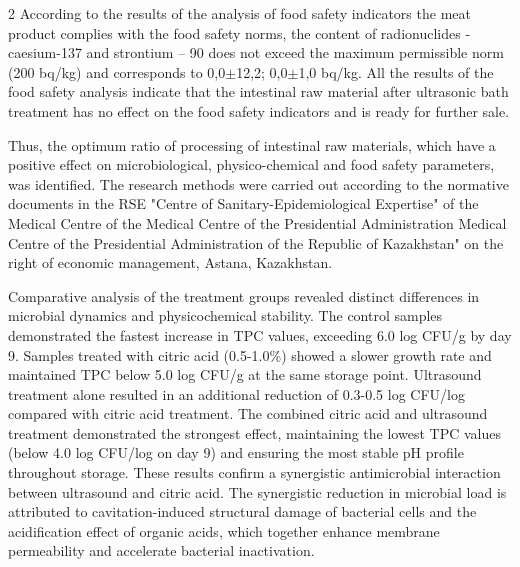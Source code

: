 \begin{multicols}{2}
According to the results of the analysis of food safety indicators the
meat product complies with the food safety norms, the content of
radionuclides - caesium-137 and strontium -- 90 does not exceed the
maximum permissible norm (200 bq/kg) and corresponds to 0,0\(\pm\)12,2;
0,0\(\pm\)1,0 bq/kg. All the results of the food safety analysis
indicate that the intestinal raw material after ultrasonic bath
treatment has no effect on the food safety indicators and is ready for
further sale.

Thus, the optimum ratio of processing of intestinal raw materials, which
have a positive effect on microbiological, physico-chemical and food
safety parameters, was identified. The research methods were carried out
according to the normative documents in the RSE "Centre of
Sanitary-Epidemiological Expertise" of the Medical Centre of the Medical
Centre of the Presidential Administration Medical Centre of the
Presidential Administration of the Republic of Kazakhstan" on the right
of economic management, Astana, Kazakhstan.

Comparative analysis of the treatment groups revealed distinct
differences in microbial dynamics and physicochemical stability. The
control samples demonstrated the fastest increase in TPC values,
exceeding 6.0 log CFU/g by day 9. Samples treated with citric acid
(0.5-1.0\%) showed a slower growth rate and maintained TPC below 5.0 log
CFU/g at the same storage point. Ultrasound treatment alone resulted in
an additional reduction of 0.3-0.5 log CFU/log compared with citric acid
treatment. The combined citric acid and ultrasound treatment
demonstrated the strongest effect, maintaining the lowest TPC values
(below 4.0 log CFU/log on day 9) and ensuring the most stable pH profile
throughout storage. These results confirm a synergistic antimicrobial
interaction between ultrasound and citric acid. The synergistic
reduction in microbial load is attributed to cavitation-induced
structural damage of bacterial cells and the acidification effect of
organic acids, which together enhance membrane permeability and
accelerate bacterial inactivation.


\end{multicols}
